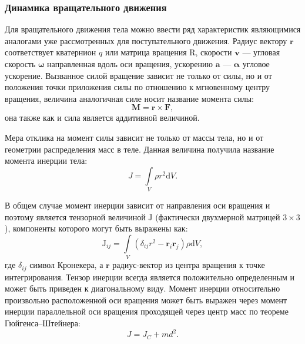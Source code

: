 \subsubsection{Динамика вращательного движения}
Для вращательного движения тела можно ввести ряд характеристик
являющимися аналогами уже рассмотренных для поступательного движения.
Радиус вектору $ \mathbf{r} $ соответствует кватернион $q$ или матрица вращения $\mathrm{R}$,
скорости $\mathbf{v}$ --- угловая скорость $\boldsymbol{\omega}$ направленная вдоль оси вращения,
ускорению $\mathbf{a}$ --- $\boldsymbol{\alpha}$ угловое ускорение.
Вызванное силой вращение зависит не только от силы, но и от положения точки приложения силы
по отношению к мгновенному центру вращения, величина аналогичная силе носит название момента силы:
\begin{equation}
 \mathbf{M} = \mathbf{r}\times{\mathbf{F}}, 
\end{equation}
она также как и сила является аддитивной величиной.

Мера отклика на момент силы зависит не только от массы тела, но и от геометрии распределения
масс в теле. Данная величина получила название момента инерции тела:
\begin{equation}
 J=\int\limits_{V} \rho r^2\mathrm{d}V.
\end{equation}

В общем случае момент инерции зависит от направления оси вращения и поэтому является тензорной
величиной $\mathrm{J}$ (фактически двухмерной матрицей \begin{math}3\times3\end{math}), компоненты которого могут
быть выражены как:
\begin{equation}
 \mathrm{J}_{ij} = \int\limits_{V} (\delta_{ij}r^2 - \mathbf{r}_i \mathbf{r}_j) \rho \mathrm{d}V,
\end{equation}
где $\delta_{ij}$ символ Кронекера, а $\mathbf{r}$ радиус-вектор из центра вращения к точке интегрирования.
Тензор инерции всегда является положительно определенным и может быть приведен к диагональному виду. Момент
инерции относительно произвольно расположенной оси вращения может быть выражен через момент инерции параллельной
оси вращения проходящей через центр масс по теореме Гюйгенса--Штейнера:
\begin{equation}
 J=J_C+md^2.
\end{equation}


